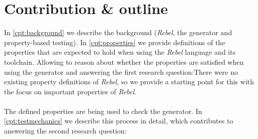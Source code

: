 \section{Contribution \& outline}
In \autoref{cpt:background} we describe the background (\textit{Rebel}, the
generator and property-based testing).
In \autoref{cpt:properties} we provide definitions of the properties that are
expected to hold when using the \textit{Rebel} language and its toolchain.
Allowing to reason about whether the properties are satisfied when using the
generator and answering the first research question:\rqOne There were
no existing property definitions of \textit{Rebel}, so we provide a starting
point for this with the focus on important properties of \textit{Rebel}.\\
\\
The defined properties are being used to check the generator. In
\autoref{cpt:testmechanics} we describe this process in detail, which
contributes to answering the second research question:\rqTwo\\
\\
